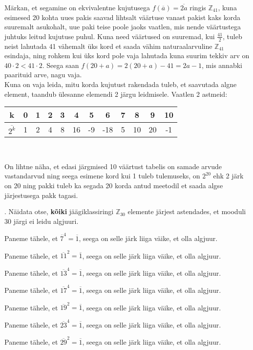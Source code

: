 \documentclass[a4paper, 10pt]{article}
\newcommand{\Z}{\mathbb{Z}}
\newcommand{\w}{\overline}
\begin{document}
\bigskip
Märkan, et segamine on ekvivalentne kujutusega $f(\w a)=\w{2a}$ ringis $\Z_{41}$, kuna esimesed 20 kohta uues pakis saavad lihtsalt väärtuse vanast pakist kaks korda suuremalt asukohalt, uue paki teise poole jaoks vaatlen, mis nende väärtustega juhtuks leitud kujutuse puhul. Kuna need väärtused on suuremad, kui $\frac{41}{2}$, tuleb neist lahutada 41 vähemalt üks kord et saada vähim naturaalarvuline $\Z_{41}$ esindaja, ning rohkem kui üks kord pole vaja lahutada kuna suurim tekkiv arv on $40\cdot2<41\cdot2$. Seega saan $f(20+a)=2(20+a)-41=2a-1$, mis annabki paarituid arve, nagu vaja.\\
Kuna on vaja leida, mitu korda kujutust rakendada tuleb, et saavutada algne element, taandub ülesanne elemendi 2 järgu leidmisele. Vaatlen 2 astmeid:
\begin{center}
\begin{tabular}{c|c|c|c|c|c|c|c|c|c|c|c}
k&0&1&2&3&4&5&6&7&8&9&10\\
\hline
$\w{2^k}$&1&2&4&8&16&-9&-18&5&10&20&-1
\end{tabular}\\
\end{center}
On lihtne näha, et edasi järgmised 10 väärtust tabelis on samade arvude vastandarvud ning seega esimene kord kui 1 tuleb tulemuseks, on $2^{20}$ ehk 2 järk on 20 ning pakki tuleb ka segada 20 korda antud meetodil et saada algse järjestusega pakk tagasi.
\bigskip

. Näidata otse, {\bf kõiki} jäägiklassiringi $\mathbb{Z}_{30}$ elemente järjest astendades, et mooduli $30$ järgi ei leidu algjuuri. 

\bigskip
Paneme tähele, et  $\w{7}^{4}=\w{1}$, seega on selle järk liiga väike, et olla algjuur. 

Paneme tähele, et  $\w{11}^{2}=\w{1}$, seega on selle järk liiga väike, et olla algjuur. 

Paneme tähele, et  $\w{13}^{4}=\w{1}$, seega on selle järk liiga väike, et olla algjuur. 

Paneme tähele, et  $\w{17}^{4}=\w{1}$, seega on selle järk liiga väike, et olla algjuur. 

Paneme tähele, et  $\w{19}^{2}=\w{1}$, seega on selle järk liiga väike, et olla algjuur. 

Paneme tähele, et  $\w{23}^{4}=\w{1}$, seega on selle järk liiga väike, et olla algjuur. 

Paneme tähele, et  $\w{29}^{2}=\w{1}$, seega on selle järk liiga väike, et olla algjuur. 
\end{document}
